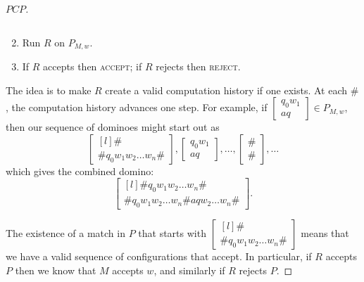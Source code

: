 \documentclass{standalone}
\begin{document}
\begin{proof}[\(\mathit{PCP}\)]
\begin{enumerate}[start=0]
\[		\]
		\item Run \(R\) on \(P_{M, w}\).
		\item If \(R\) accepts then \textsc{accept}; if \(R\) rejects then \textsc{reject}.
	\end{enumerate}
	The idea is to make \(R\) create a valid computation history if one exists. At each \(\texttt\#\), the computation history advances one step. For example, if \(\begin{bmatrix} q_0 w_1 \\ a q \end{bmatrix} \in P_{M, w}\), then our sequence of dominoes might start out as
	\[
		\begin{bmatrix*}[l] \texttt\# \\ \texttt\# q_0 w_1 w_2 \dots w_n \texttt\# \end{bmatrix*},
		\begin{bmatrix} q_0 w_1 \\ a q \end{bmatrix}, \dots,
		\begin{bmatrix} \texttt\# \\ \texttt\# \end{bmatrix}, \dots
	\]
	which gives the combined domino:
	\[
		\begin{bmatrix*}[l]
			\texttt\# q_0 w_1 w_2 \dots w_n \texttt\# \\
			\texttt\# q_0 w_1 w_2 \dots w_n \texttt\# a q w_2 \dots w_n \texttt\#
		\end{bmatrix*}.
	\]
	
	The existence of a match in \(P\) that starts with \(\begin{bmatrix*}[l] \texttt\# \\ \texttt\# q_0 w_1 w_2 \dots w_n \texttt\# \end{bmatrix*}\) means that we have a valid sequence of configurations that accept. In particular, if \(R\) accepts \(P\) then we know that \(M\) accepts \(w\), and similarly if \(R\) rejects \(P\).
\end{proof}
\end{document}

